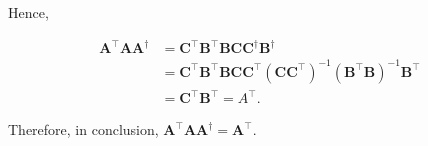 Hence,

\[
	\begin{aligned}
		\boldsymbol{A}^{\top} \boldsymbol{A} \boldsymbol{A}^{\dagger} & =\boldsymbol{C}^{\top} \boldsymbol{B}^{\top} \boldsymbol{B} \boldsymbol{C} \boldsymbol{C}^{\dagger} \boldsymbol{B}^{\dagger} \\
		& =\boldsymbol{C}^{\top} \boldsymbol{B}^{\top} \boldsymbol{B} \boldsymbol{C} \boldsymbol{C}^{\top}\left(\boldsymbol{C} \boldsymbol{C}^{\top}\right)^{-1}\left(\boldsymbol{B}^{\top} \boldsymbol{B}\right)^{-1} \boldsymbol{B}^{\top} \\
		& =\boldsymbol{C}^{\top} \boldsymbol{B}^{\top}=A^{\top} .
	\end{aligned}
\]

Therefore, in conclusion, \(\boldsymbol{A}^{\top} \boldsymbol{A} \boldsymbol{A}^{\dagger}=\boldsymbol{A}^{\top}\).
